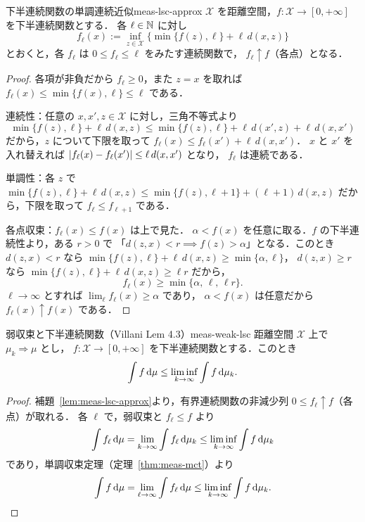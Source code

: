\begin{lemma}{下半連続関数の単調連続近似}{meas-lsc-approx}
  $\mathcal{X}$ を距離空間，$f\colon \mathcal{X}\to[0,+\infty]$ を下半連続関数とする．
  各 $\ell\in\mathbb{N}$ に対し
  \[
    f_\ell(x):=\inf_{z\in \mathcal{X}}\bigl\{\min\{f(z),\ell\}+\ell\,d(x,z)\bigr\}
  \]
  とおくと，各 $f_\ell$ は $0\leq f_\ell\leq\ell$ をみたす連続関数で，
  $f_\ell\uparrow f$（各点）となる．
\end{lemma}

\begin{proof}
  各項が非負だから $f_\ell\geq0$，また $z=x$ を取れば
  $f_\ell(x)\leq\min\{f(x),\ell\}\leq\ell$ である．

  連続性：任意の $x,x',z\in \mathcal{X}$ に対し，三角不等式より
  \[
    \min\{f(z),\ell\}+\ell\,d(x,z)
    \leq
    \min\{f(z),\ell\}+\ell\,d(x',z)+\ell\,d(x,x')
  \]
  だから，$z$ について下限を取って
  $f_\ell(x)\leq f_\ell(x')+\ell\,d(x,x')$．
  $x$ と $x'$ を入れ替えれば
  $\lvert f_\ell(x)-f_\ell(x') \rvert\leq\ell\,d(x,x')$ となり，
  $f_\ell$ は連続である．

  単調性：各 $z$ で
  $\min\{f(z),\ell\}+\ell\,d(x,z)
  \leq\min\{f(z),\ell+1\}+(\ell+1)\,d(x,z)$
  だから，下限を取って $f_\ell\leq f_{\ell+1}$ である．

  各点収束：$f_\ell(x)\leq f(x)$ は上で見た．
  $\alpha<f(x)$ を任意に取る．$f$ の下半連続性より，ある $r>0$ で
  「$d(z,x)<r\implies f(z)>\alpha$」となる．このとき
  $d(z,x)<r$ なら
  $\min\{f(z),\ell\}+\ell\,d(x,z)\geq\min\{\alpha,\ell\}$，
  $d(z,x)\geq r$ なら
  $\min\{f(z),\ell\}+\ell\,d(x,z)\geq\ell r$ だから，
  \[
    f_\ell(x)\geq\min\{\alpha,\,\ell,\,\ell r\}.
  \]
  $\ell\to\infty$ とすれば $\lim_\ell f_\ell(x)\geq\alpha$ であり，
  $\alpha<f(x)$ は任意だから $f_\ell(x)\uparrow f(x)$ である．
\end{proof}

\begin{lemma}{弱収束と下半連続関数（Villani Lem 4.3）}{meas-weak-lsc}
  距離空間 $\mathcal{X}$ 上で $\mu_k\Rightarrow\mu$ とし，
  $f\colon\mathcal{X}\to[0,+\infty]$ を下半連続関数とする．このとき
  \[
    \int f\,\mathrm{d}\mu\leq\liminf_{k\to\infty}\int f\,\mathrm{d}\mu_k.
  \]
\end{lemma}

\begin{proof}
  補題~\ref{lem:meas-lsc-approx}より，有界連続関数の非減少列
  $0\leq f_\ell\uparrow f$（各点）が取れる．
  各 $\ell$ で，弱収束と $f_\ell\leq f$ より
  \[
    \int f_\ell\,\mathrm{d}\mu
    =\lim_{k\to\infty}\int f_\ell\,\mathrm{d}\mu_k
    \leq\liminf_{k\to\infty}\int f\,\mathrm{d}\mu_k
  \]
  であり，単調収束定理（定理~\ref{thm:meas-mct}）より
  \[
    \int f\,\mathrm{d}\mu
    =\lim_{\ell\to\infty}\int f_\ell\,\mathrm{d}\mu
    \leq\liminf_{k\to\infty}\int f\,\mathrm{d}\mu_k.  \qedhere
  \]
\end{proof}

